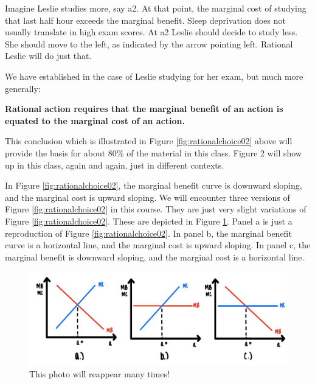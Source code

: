 \documentclass[
]{book}
\begin{document}
Imagine Leslie studies more, say a2. At that point, the marginal cost of studying that last half hour exceeds the marginal benefit. Sleep deprivation does not usually translate in high exam scores. At a2 Leslie should decide to study less. She should move to the left, as indicated by the arrow pointing left. Rational Leslie will do just that.

We have established in the case of Leslie studying for her exam, but much more generally:

\begin{iucolor}
\textbf{Rational action requires that the marginal benefit of an action is equated to the marginal cost of an action.}

\end{iucolor}

This conclusion which is illustrated in Figure \ref{fig:rationalchoice02} above will provide the basis for about 80\% of the material in this class. Figure 2 will show up in this class, again and again, just in different contexts.

In Figure \ref{fig:rationalchoice02}, the marginal benefit curve is downward sloping, and the marginal cost is upward sloping. We will encounter three versions of Figure \ref{fig:rationalchoice02} in this course. They are just very slight variations of Figure \ref{fig:rationalchoice02}. These are depicted in Figure \ref{fig:rationalchoice03}. Panel a is just a reproduction of Figure \ref{fig:rationalchoice02}. In panel b, the marginal benefit curve is a horizontal line, and the marginal cost is upward sloping. In panel c, the marginal benefit is downward sloping, and the marginal cost is a horizontal line.

\begin{figure}

{\centering \includegraphics[width=1\linewidth]{img/rationalchoice/panels} 

}

\caption{This photo will reappear many times!}\label{fig:rationalchoice03}
\end{figure}
\end{document}
